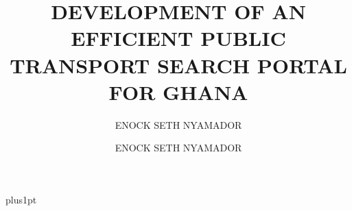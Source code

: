 \documentclass[oneside,12pt]{Latex/Classes/PhDthesisPSnPDF}
\title{DEVELOPMENT OF AN EFFICIENT PUBLIC TRANSPORT SEARCH PORTAL FOR GHANA}
\author{{ENOCK SETH NYAMADOR}}
\author{ENOCK SETH NYAMADOR}
\begin{document}

\renewcommand\baselinestretch{1.5}
\baselineskip=18pt plus1pt





\maketitle  %



\frontmatter




%   








\setcounter{secnumdepth}{3} %
\setcounter{tocdepth}{3}    %
\renewcommand\contentsname{TABLE OF CONTENTS}
\tableofcontents            %


\renewcommand\listfigurename{\textbf{LIST OF FIGURES}}
\listoffigures	%

\end{document}
